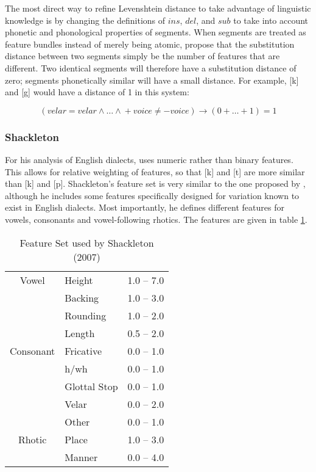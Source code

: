 \documentclass[11pt]{article}
\begin{document}
The most direct way to refine Levenshtein distance to take advantage
of linguistic knowledge is by changing the definitions of $ins$,
$del$, and $sub$ to take into account phonetic and phonological
properties of segments. When segments are treated as feature bundles
instead of merely being atomic,  propose that the
substitution distance between two segments simply be the number of
features that are different. Two identical segments will therefore
have a substitution distance of zero; segments phonetically similar
will have a small distance. For example, [k] and [g] would have a
distance of 1 in this system:

\[ (velar=velar \land{} \ldots \land{} +voice\neq -voice) \to (0
+ \ldots + 1) = 1\]

\subsubsection{Shackleton}
For his analysis of English dialects,  uses
numeric rather than binary features. This allows for relative
weighting of features, so that [k] and [t] are more similar than [k]
and [p]. Shackleton's feature set is very similar to the one proposed by
, although he includes some features specifically
designed for variation known to exist in English dialects. Most
importantly, he defines different features for vowels, consonants and
vowel-following rhotics. The features are given in table
\ref{featureset}.

\begin{table}
\begin{tabular}{c|lr}
Vowel & Height & 1.0 -- 7.0 \\
  & Backing & 1.0 -- 3.0 \\
  & Rounding & 1.0 -- 2.0 \\
  & Length & 0.5 -- 2.0 \\ \hline
Consonant & Fricative & 0.0 -- 1.0 \\
  & h/wh & 0.0 -- 1.0 \\
  & Glottal  Stop &0.0 -- 1.0 \\
  & Velar & 0.0 -- 2.0 \\
  & Other & 0.0 -- 1.0 \\ \hline
Rhotic & Place & 1.0 -- 3.0 \\
  & Manner & 0.0 -- 4.0 \\
\end{tabular}
\caption{Feature Set used by Shackleton (2007)}
\label{featureset}
\end{table}
\end{document}
